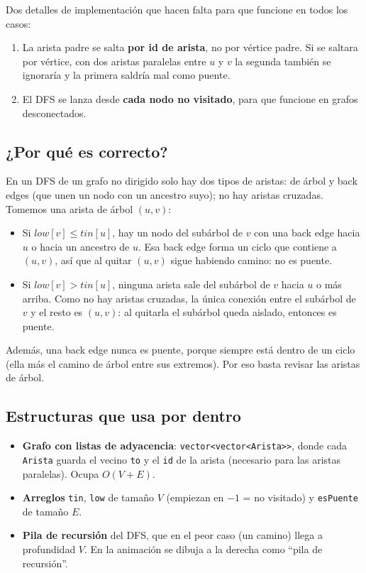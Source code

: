 Dos detalles de implementación que hacen falta para que funcione en todos los casos:
\begin{enumerate}
  \item La arista padre se salta \textbf{por id de arista}, no por vértice padre. Si se saltara por
        vértice, con dos aristas paralelas entre $u$ y $v$ la segunda también se ignoraría y la primera
        saldría mal como puente.
  \item El DFS se lanza desde \textbf{cada nodo no visitado}, para que funcione en grafos desconectados.
\end{enumerate}

\subsection{¿Por qué es correcto?}
En un DFS de un grafo no dirigido solo hay dos tipos de aristas: de árbol y back edges (que unen un nodo
con un ancestro suyo); no hay aristas cruzadas. Tomemos una arista de árbol $(u,v)$:
\begin{itemize}
  \item Si $\mathit{low}[v]\le\mathit{tin}[u]$, hay un nodo del subárbol de $v$ con una back edge hacia $u$
        o hacia un ancestro de $u$. Esa back edge forma un ciclo que contiene a $(u,v)$, así que al quitar
        $(u,v)$ sigue habiendo camino: no es puente.
  \item Si $\mathit{low}[v]>\mathit{tin}[u]$, ninguna arista sale del subárbol de $v$ hacia $u$ o más
        arriba. Como no hay aristas cruzadas, la única conexión entre el subárbol de $v$ y el resto es
        $(u,v)$: al quitarla el subárbol queda aislado, entonces es puente.
\end{itemize}
Además, una back edge nunca es puente, porque siempre está dentro de un ciclo (ella más el camino de
árbol entre sus extremos). Por eso basta revisar las aristas de árbol.

\subsection{Estructuras que usa por dentro}
\begin{itemize}
  \item \textbf{Grafo con listas de adyacencia}: \texttt{vector<vector<Arista>>}, donde cada
        \texttt{Arista} guarda el vecino \texttt{to} y el \texttt{id} de la arista (necesario para las
        aristas paralelas). Ocupa $O(V+E)$.
  \item \textbf{Arreglos} \texttt{tin}, \texttt{low} de tamaño $V$ (empiezan en $-1$ = no visitado) y
        \texttt{esPuente} de tamaño $E$.
  \item \textbf{Pila de recursión} del DFS, que en el peor caso (un camino) llega a profundidad $V$.
        En la animación se dibuja a la derecha como ``pila de recursión''.
\end{itemize}

